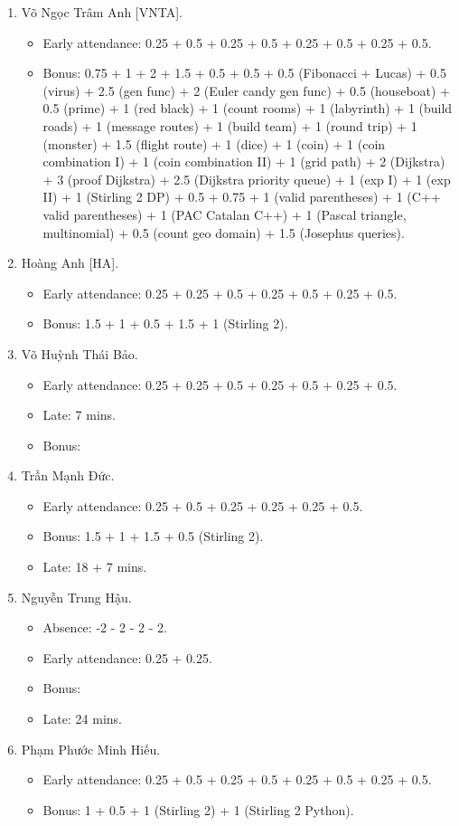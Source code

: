 \documentclass{article}
\begin{document}
\begin{enumerate}
	\item {\sc Võ Ngọc Trâm Anh [VNTA].}
	\begin{itemize}
		\item Early attendance: 0.25 + 0.5 + 0.25 + 0.5 + 0.25 + 0.5 + 0.25  + 0.5.
		\item Bonus: 0.75 + 1 + 2 + 1.5 + 0.5 + 0.5 + 0.5 (Fibonacci + Lucas) + 0.5 (virus) + 2.5 (gen func) + 2 (Euler candy gen func) + 0.5 (houseboat) + 0.5 (prime) + 1 (red black) + 1 (count rooms) + 1 (labyrinth) + 1 (build roads) + 1 (message routes) + 1 (build team) + 1 (round trip) + 1 (monster) + 1.5 (flight route) + 1 (dice) + 1 (coin) + 1 (coin combination I) + 1 (coin combination II) + 1 (grid path) + 2 (Dijkstra) + 3 (proof Dijkstra) + 2.5 (Dijkstra priority queue) + 1 (exp I) + 1 (exp II) + 1 (Stirling 2 DP) + 0.5 + 0.75 + 1 (valid parentheses) + 1 (C++ valid parentheses) + 1 (PAC Catalan C++) + 1 (Pascal triangle, multinomial) + 0.5 (count geo domain) + 1.5 (Josephus queries).
	\end{itemize}
	\item {\sc Hoàng Anh [HA].}
	\begin{itemize}
		\item Early attendance: 0.25 + 0.25 + 0.5 + 0.25 + 0.5 + 0.25 + 0.5.
		\item Bonus: 1.5 + 1 + 0.5 + 1.5 + 1 (Stirling 2).
	\end{itemize}
	\item {\sc Võ Huỳnh Thái Bảo.}
	\begin{itemize}
		\item Early attendance: 0.25 + 0.25 + 0.5 + 0.25 + 0.5 + 0.25 + 0.5.
		\item Late: 7 mins.
		\item Bonus: 
	\end{itemize}
	\item {\sc Trần Mạnh Đức.}
	\begin{itemize}
		\item Early attendance: 0.25 + 0.5 + 0.25 + 0.25 + 0.25 + 0.5.
		\item Bonus: 1.5 + 1 + 1.5 + 0.5 (Stirling 2).
		\item Late: 18 + 7 mins.
	\end{itemize}
	\item {\sc Nguyễn Trung Hậu.}
	\begin{itemize}
		\item Absence: -2 - 2 - 2 - 2.
		\item Early attendance: 0.25 + 0.25.
		\item Bonus:
		\item Late: 24 mins.
	\end{itemize}
	\item {\sc Phạm Phước Minh Hiếu.}
	\begin{itemize}
		\item Early attendance: 0.25 + 0.5 + 0.25 + 0.5 + 0.25 + 0.5 + 0.25 + 0.5.
		\item Bonus: 1 + 0.5 + 1 (Stirling 2) + 1 (Stirling 2 Python).		
		

\end{itemize}
\end{enumerate}
\end{document}

